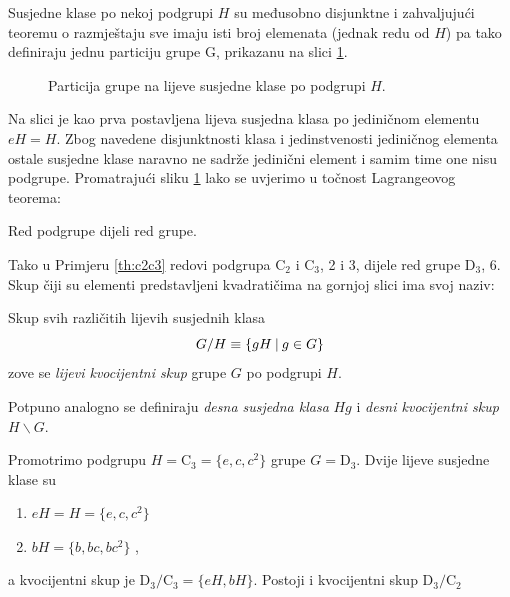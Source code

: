 Susjedne klase po nekoj podgrupi $H$ su međusobno disjunktne i
zahvaljujući teoremu o razmještaju sve imaju isti broj elemenata (jednak redu od $H$)
pa tako definiraju jednu particiju grupe G, prikazanu na slici \ref{fig:lagrange}.
\begin{figure}[htpb]
    \centering
    
    \caption{Particija grupe na lijeve susjedne klase po podgrupi $H$.}
    \label{fig:lagrange}
\end{figure}
Na slici je kao prva postavljena lijeva susjedna klasa po jediničnom
elementu $eH = H$. Zbog navedene disjunktnosti klasa i jedinstvenosti
jediničnog elementa ostale susjedne klase naravno ne sadrže jedinični element i
samim time one nisu podgrupe. 
Promatrajući sliku \ref{fig:lagrange} lako se uvjerimo u točnost Lagrangeovog
teorema: 

\begin{teorem}[Lagrange]
      
Red podgrupe dijeli red grupe.
\end{teorem}

Tako u Primjeru \ref{th:c2c3} redovi podgrupa C$_2$ i C$_3$, 2 i 3, dijele red
grupe D$_3$, 6.  
Skup čiji su elementi predstavljeni kvadratičima na gornjoj slici
ima svoj naziv:

\begin{definicija}
Skup svih različitih lijevih susjednih klasa 
\begin{displaymath}
      G/H \equiv \{gH \: | \: g\in G\}
\end{displaymath}
zove se \emph{lijevi kvocijentni skup} grupe $G$ po podgrupi $H$.
\end{definicija}

Potpuno analogno se definiraju \emph{desna susjedna klasa} $Hg$
i \emph{desni kvocijentni skup} $H\backslash G$.

\begin{primjer}[D$_3$]
    Promotrimo podgrupu $H=\mathrm{C}_3=\{e, c, c^2\}$ grupe $G=\mathrm{D}_3$.
Dvije lijeve susjedne klase su
\begin{enumerate}
\item $eH=H=\{e, c, c^2\}$ \; 
\item $bH=\{b, bc, bc^2\}$ \;,
\end{enumerate}
a kvocijentni skup je $\mathrm{D}_3/\mathrm{C}_3=\{eH, bH\}$. Postoji i kvocijentni 
skup $\mathrm{D}_3/\mathrm{C}_2$
\end{primjer}

